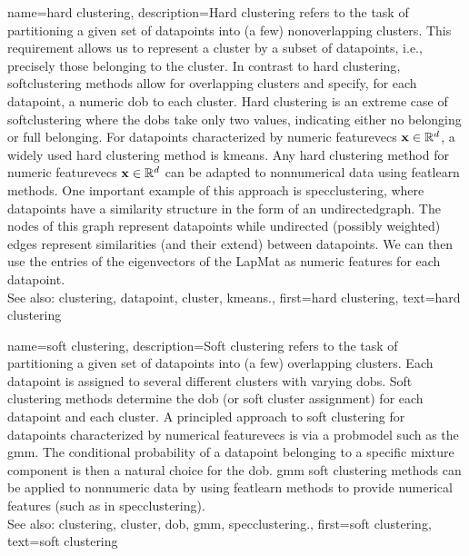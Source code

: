 {name={hard clustering}, 
	description={Hard \gls{clustering} 
		refers to the task of partitioning a given set of \glspl{datapoint} 
		into (a few) nonoverlapping \glspl{cluster}. This requirement 
		allows us to represent a \gls{cluster} by a subset of \glspl{datapoint}, 
		i.e., precisely those belonging to the \gls{cluster}. In contrast to 
		hard \gls{clustering}, \gls{softclustering} methods allow for overlapping 
		\glspl{cluster} and specify, for each \gls{datapoint}, a numeric \gls{dob} 
		to each \gls{cluster}. Hard \gls{clustering} is an extreme case of \gls{softclustering} 
		where the \glspl{dob} take only two values, indicating either no belonging or 
		full belonging. 
		For \glspl{datapoint} characterized by numeric \glspl{featurevec} ${\bf x} \in \mathbb{R}^{d}$, 
		a widely used hard \gls{clustering} method is \gls{kmeans}. Any hard
		\gls{clustering} method for numeric \glspl{featurevec} ${\bf x} \in \mathbb{R}^{d}$ can 
		be adapted to nonnumerical \gls{data} using \gls{featlearn} methods. 
		One important example of this approach is \gls{specclustering}, where 
		\glspl{datapoint} have a similarity structure in the form of an  
		\gls{undirectedgraph}. The nodes of this \gls{graph} represent \glspl{datapoint} 
		while undirected (possibly weighted) edges represent similarities (and their 
		extend) between \glspl{datapoint}. We can then use the entries of the 
		\glspl{eigenvector} of the \gls{LapMat} as numeric \glspl{feature} for 
		each \gls{datapoint}. 
		\\
		See also: \gls{clustering}, \gls{datapoint}, \gls{cluster}, \gls{kmeans}.},
	first={hard clustering},
	text={hard clustering} 
}
	
{name={soft clustering}, 
	description={Soft \gls{clustering} 
		refers to the task of partitioning a given set of \glspl{datapoint} into (a few) 
		overlapping \glspl{cluster}. Each \gls{datapoint} is assigned to several different 
		\glspl{cluster} with varying \glspl{dob}. Soft \gls{clustering} methods determine the 
		\gls{dob} (or soft \gls{cluster} assignment) for each \gls{datapoint} and each \gls{cluster}.
		A principled approach to soft \gls{clustering} for \glspl{datapoint} characterized by 
		numerical \glspl{featurevec} is via a \gls{probmodel} such as the \gls{gmm}. 
		The conditional \gls{probability} of a \gls{datapoint} belonging to a specific mixture 
		component is then a natural choice for the \gls{dob}. \Gls{gmm} soft \gls{clustering} 
		methods can be applied to nonnumeric \gls{data} by using \gls{featlearn} methods 
		to provide numerical \glspl{feature} (such as in \gls{specclustering}). 
				\\
		See also: \gls{clustering}, \gls{cluster}, \gls{dob}, \gls{gmm}, \gls{specclustering}.},
	first={soft clustering},
	text={soft clustering} 
}

